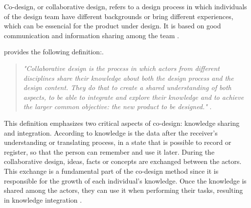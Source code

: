 Co-design, or collaborative design, refers to a design process in which individuals of the design team have different backgrounds or bring different experiences, which can be essencial for the product under design. It is based on good communication and information sharing among the team \cite{chiu2002organizational}.

 provides the following definition:.

\begin{quote}
    \textit{"Collaborative design is the process in which actors from different disciplines share their knowledge about both the design process and the design content. They do that to create a shared understanding of both aspects, to be able to integrate and explore their knowledge and to achieve the larger common objective: the new product to be designed."} \cite{kleinsmann2006understanding}.
\end{quote}

This definition emphasizes two critical aspects of co-design: knowledge sharing and integration. According to  knowledge is the data after the receiver's understanding or translating process, in a state that is possible to record or register, so that the person can remember and use it later. During the collaborative design, ideas, facts or concepts are exchanged between the actors. This exchange is a fundamental part of the co-design method since it is responsible for the growth of each individual's knowledge. Once the knowledge is shared among the actors, they can use it when performing their tasks, resulting in knowledge integration \cite{kleinsmann2006understanding}.